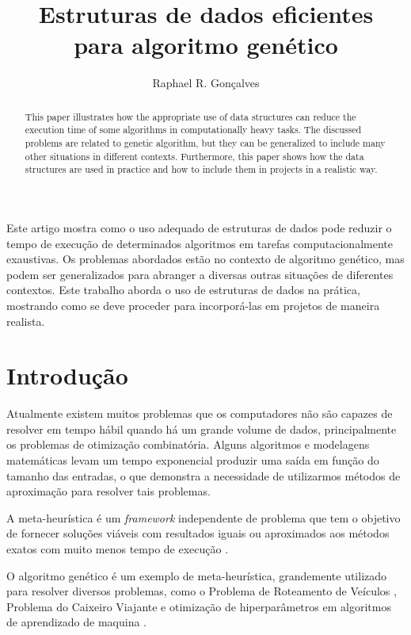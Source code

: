 \documentclass[12pt]{article}
\title{Estruturas de dados eficientes\\ para algoritmo gen\'{e}tico}
\author{Raphael R. Gon\c{c}alves\inst{1}}
\begin{document}
 

\maketitle

\begin{abstract}
    This paper illustrates how the appropriate use of data structures can reduce
    the execution time of some algorithms in computationally heavy tasks. The
    discussed problems are related to genetic algorithm, but they can be
    generalized to include many other situations in different contexts.
    Furthermore, this paper shows how the data structures are used in practice
    and how to include them in projects in a realistic way.
\end{abstract}
     
\begin{resumo} 
    Este artigo mostra como o uso adequado de estruturas de dados pode reduzir o tempo
    de execu\c{c}\~{a}o de determinados algoritmos em tarefas computacionalmente exaustivas.
    Os problemas abordados est\~{a}o no contexto de algoritmo gen\'{e}tico, mas podem ser
    generalizados para abranger a diversas outras situa\c{c}\~{o}es de diferentes
    contextos. Este trabalho aborda o uso de estruturas de dados na pr\'{a}tica,
    mostrando como se deve proceder para incorpor\'{a}-las em projetos de maneira
    realista.
\end{resumo}


\section{Introdu\c{c}\~{a}o}

Atualmente existem muitos problemas que os computadores n\~{a}o s\~{a}o capazes de resolver em tempo
h\'{a}bil quando h\'{a} um grande volume de dados, principalmente os problemas de otimiza\c{c}\~{a}o
combinat\'{o}ria. Alguns algoritmos e modelagens matem\'{a}ticas levam um tempo exponencial produzir
uma sa\'{i}da em fun\c{c}\~{a}o do tamanho das entradas, o que demonstra a necessidade de utilizarmos
m\'{e}todos de aproxima\c{c}\~{a}o para resolver tais problemas.

A meta-heur\'{i}stica \'{e} um \textit{framework} independente de problema que tem o objetivo
de fornecer solu\c{c}\~{o}es vi\'{a}veis com resultados iguais ou aproximados aos m\'{e}todos
exatos com muito menos tempo de execu\c{c}\~{a}o \cite{book:metaheuristics}.

O algoritmo gen\'{e}tico \'{e} um exemplo de meta-heur\'{i}stica, grandemente utilizado para
resolver diversos problemas, como o Problema de Roteamento de Ve\'{i}culos \cite{berger:03}, Problema do Caixeiro
Viajante e otimiza\c{c}\~{a}o de hiperpar\^{a}metros em algoritmos de aprendizado de maquina \cite{misc:introGA}.
\end{document}
